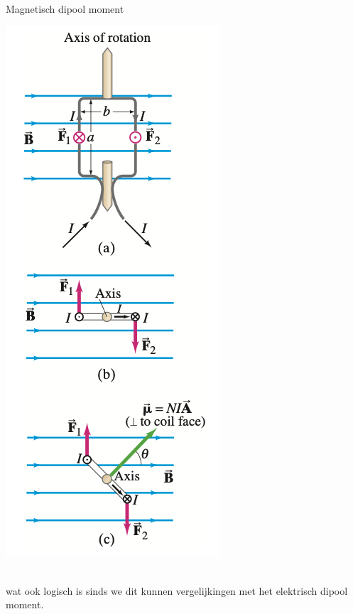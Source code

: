 \begin{theo}{Magnetisch dipool moment}
\begin{minipage}{0.79\textwidth}
    \end{minipage}
    \begin{minipage}{.17\textwidth}
        \vspace{0.5cm}\includegraphics[scale = 0.32]{Images/Magnetisme/MagnetischDipoolMoment}
    \end{minipage}
    \vspace{-0.1cm}\\
    wat ook logisch is sinds we dit kunnen vergelijkingen met het elektrisch dipool moment.
\end{theo}


